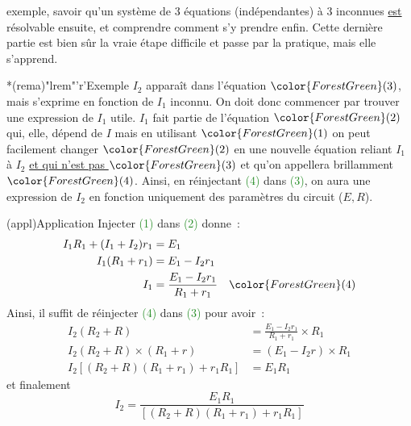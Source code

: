\documentclass[../TDE1-E2.tex]{subfiles}%
\begin{document}
{\begin{tcbraster}[raster columns=2, raster equal height=rows]
\begin{tcn}
        exemple, savoir qu'un système de 3 équations (indépendantes) à 3
        inconnues \underline{est} résolvable ensuite, et comprendre comment s'y
        prendre enfin. Cette dernière partie est bien sûr la vraie étape
        difficile et passe par la pratique, mais elle s'apprend.
    \end{tcn}
    \begin{tcn}*(rema)"lrem"'r'{Exemple}
        $I_2$ apparaît dans l'équation $\color{ForestGreen}(3)$, mais s'exprime
        en fonction de $I_1$ inconnu. On doit donc commencer par trouver une
        expression de $I_1$ utile. $I_1$ fait partie de l'équation
        $\color{ForestGreen}(2)$ qui, elle, dépend de $I$ mais en utilisant
        $\color{ForestGreen}(1)$ on peut facilement changer
        $\color{ForestGreen}(2)$ en une nouvelle équation reliant $I_1$ à $I_2$
        \underline{et qui n'est pas $\color{ForestGreen}(3)$} et qu'on
        appellera brillamment $\color{ForestGreen}(4)$. Ainsi, en réinjectant
        \textcolor{ForestGreen}{(4)} dans \textcolor{ForestGreen}{(3)}, on aura
        une expression de $I_2$ en fonction uniquement des paramètres du circuit
        ($E, R$).
    \end{tcn}
\end{tcbraster}

\begin{center}
    \begin{tcn}[sidebyside, righthand ratio=.55](appl){Application}
        Injecter \textcolor{ForestGreen}{(1)} dans \textcolor{ForestGreen}{(2)}
        donne~:
        \begin{align*}
            I_1R_1 + (I_1+I_2)r_1 &= E_1\\
            I_1(R_1+r_1) &= E_1-I_2r_1\\
            I_1 &= \frac{E_1 - I_2r_1}{R_1 + r_1} \quad \color{ForestGreen}(4)
        \end{align*}
        Ainsi, il suffit de réinjecter \textcolor{ForestGreen}{(4)} dans
        \textcolor{ForestGreen}{(3)} pour avoir~:
        \tcblower
        \begin{align*}
            I_2(R_2+R) &= \frac{E_1 - I_2r_1}{R_1 + r_1}\times R_1\\
            I_2(R_2+R)\times(R_1+r) &= (E_1-I_2r)\times R_1\\
            I_2 \left[ (R_2+R)(R_1+r_1)+r_1R_1 \right] &= E_1R_1
        \end{align*}
        et finalement
        \[\boxed{I_2 = \frac{E_1R_1}{\left[ (R_2+R)(R_1+r_1)+r_1R_1 \right]}}\]
    \end{tcn}
\end{center}
  }%
\end{document}

